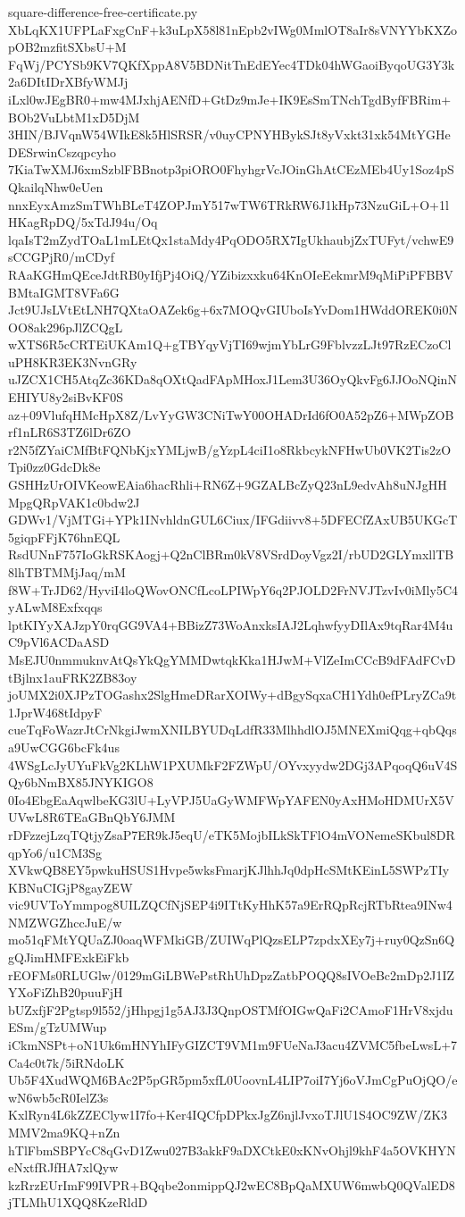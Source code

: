 \documentclass[11pt]{article}
\theoremstyle{definition}
\theoremstyle{remark}
\begin{document}
\begin{filecontents*}[overwrite]{square-difference-free-certificate.py}
XbLqKX1UFPLaFxgCnF+k3uLpX58l81nEpb2vIWg0MmlOT8aIr8sVNYYbKXZopOB2mzfitSXbsU+M
FqWj/PCYSb9KV7QKfXppA8V5BDNitTnEdEYec4TDk04hWGaoiByqoUG3Y3k2a6DItIDrXBfyWMJj
iLxl0wJEgBR0+mw4MJxhjAENfD+GtDz9mJe+IK9EsSmTNchTgdByfFBRim+BOb2VuLbtM1xD5DjM
3HIN/BJVqnW54WIkE8k5HlSRSR/v0uyCPNYHBykSJt8yVxkt31xk54MtYGHeDESrwinCszqpcyho
7KiaTwXMJ6xmSzblFBBnotp3piORO0FhyhgrVcJOinGhAtCEzMEb4Uy1Soz4pSQkailqNhw0eUen
nnxEyxAmzSmTWhBLeT4ZOPJmY517wTW6TRkRW6J1kHp73NzuGiL+O+1lHKagRpDQ/5xTdJ94u/Oq
lqaIsT2mZydTOaL1mLEtQx1staMdy4PqODO5RX7IgUkhaubjZxTUFyt/vchwE9sCCGPjR0/mCDyf
RAaKGHmQEceJdtRB0yIfjPj4OiQ/YZibizxxku64KnOIeEekmrM9qMiPiPFBBVBMtaIGMT8VFa6G
Jct9UJsLVtEtLNH7QXtaOAZek6g+6x7MOQvGIUboIsYvDom1HWddOREK0i0NOO8ak296pJlZCQgL
wXTS6R5cCRTEiUKAm1Q+gTBYqyVjTI69wjmYbLrG9FblvzzLJt97RzECzoCluPH8KR3EK3NvnGRy
uJZCX1CH5AtqZc36KDa8qOXtQadFApMHoxJ1Lem3U36OyQkvFg6JJOoNQinNEHIYU8y2siBvKF0S
az+09VlufqHMcHpX8Z/LvYyGW3CNiTwY00OHADrId6fO0A52pZ6+MWpZOBrf1nLR6S3TZ6lDr6ZO
r2N5fZYaiCMfBtFQNbKjxYMLjwB/gYzpL4ciI1o8RkbcykNFHwUb0VK2Tis2zOTpi0zz0GdcDk8e
GSHHzUrOIVKeowEAia6hacRhli+RN6Z+9GZALBcZyQ23nL9edvAh8uNJgHHMpgQRpVAK1c0bdw2J
GDWv1/VjMTGi+YPk1INvhldnGUL6Ciux/IFGdiivv8+5DFECfZAxUB5UKGcT5giqpFFjK76hnEQL
RsdUNnF757IoGkRSKAogj+Q2nClBRm0kV8VSrdDoyVgz2I/rbUD2GLYmxllTB8lhTBTMMjJaq/mM
f8W+TrJD62/HyviI4loQWovONCfLcoLPIWpY6q2PJOLD2FrNVJTzvIv0iMly5C4yALwM8Exfxqqs
lptKIYyXAJzpY0rqGG9VA4+BBizZ73WoAnxksIAJ2LqhwfyyDIlAx9tqRar4M4uC9pVl6ACDaASD
MsEJU0nmmuknvAtQsYkQgYMMDwtqkKka1HJwM+VlZeImCCcB9dFAdFCvDtBjlnx1auFRK2ZB83oy
joUMX2i0XJPzTOGashx2SlgHmeDRarXOIWy+dBgySqxaCH1Ydh0efPLryZCa9t1JprW468tIdpyF
cueTqFoWazrJtCrNkgiJwmXNILBYUDqLdfR33MlhhdlOJ5MNEXmiQqg+qbQqsa9UwCGG6bcFk4us
4WSgLcJyUYuFkVg2KLhW1PXUMkF2FZWpU/OYvxyydw2DGj3APqoqQ6uV4SQy6bNmBX85JNYKIGO8
0Io4EbgEaAqwlbeKG3lU+LyVPJ5UaGyWMFWpYAFEN0yAxHMoHDMUrX5VUVwL8R6TEaGBnQbY6JMM
rDFzzejLzqTQtjyZsaP7ER9kJ5eqU/eTK5MojbILkSkTFlO4mVONemeSKbul8DRqpYo6/u1CM3Sg
XVkwQB8EY5pwkuHSUS1Hvpe5wksFmarjKJlhhJq0dpHcSMtKEinL5SWPzTIyKBNuCIGjP8gayZEW
vic9UVToYmmpog8UILZQCfNjSEP4i9ITtKyHhK57a9ErRQpRcjRTbRtea9INw4NMZWGZhccJuE/w
mo51qFMtYQUaZJ0oaqWFMkiGB/ZUIWqPlQzsELP7zpdxXEy7j+ruy0QzSn6QgQJimHMFExkEiFkb
rEOFMs0RLUGlw/0129mGiLBWePstRhUhDpzZatbPOQQ8sIVOeBc2mDp2J1IZYXoFiZhB20puuFjH
bUZxfjF2Pgtsp9l552/jHhpgj1g5AJ3J3QnpOSTMfOIGwQaFi2CAmoF1HrV8xjduESm/gTzUMWup
iCkmNSPt+oN1Uk6mHNYhIFyGIZCT9VM1m9FUeNaJ3acu4ZVMC5fbeLwsL+7Ca4c0t7k/5iRNdoLK
Ub5F4XudWQM6BAc2P5pGR5pm5xfL0UoovnL4LIP7oiI7Yj6oVJmCgPuOjQO/ewN6wb5cR0IelZ3s
KxlRyn4L6kZZEClyw1I7fo+Ker4IQCfpDPkxJgZ6njlJvxoTJlU1S4OC9ZW/ZK3MMV2ma9KQ+nZn
hTlFbmSBPYcC8qGvD1Zwu027B3akkF9aDXCtkE0xKNvOhjl9khF4a5OVKHYNeNxtfRJfHA7xlQyw
kzRrzEUrImF99IVPR+BQqbe2onmippQJ2wEC8BpQaMXUW6mwbQ0QValED8jTLMhU1XQQ8KzeRldD

\end{filecontents*}
\end{document}
